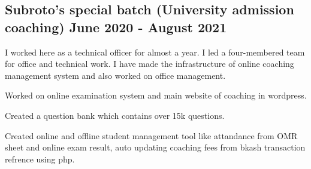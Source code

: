 \documentclass[a4paper,12pt]{article}
\begin{document}


\subsection{{Subroto's special batch (University admission coaching) \hfill June 2020 - August 2021}}
\vspace*{3pt}
I worked here as a technical officer for almost a year. I led a four-membered team for office and technical work. I have made the infrastructure of online coaching management system and also worked on office management. 
\begin{zitemize}
\item Worked on online examination system and main website of coaching in wordpress. 
\item Created a question bank which contains over 15k questions.
\item Created online and offline student management tool like attandance from OMR sheet and online exam result,  auto updating coaching fees from bkash transaction refrence using php.
\end{zitemize}
\end{document}
